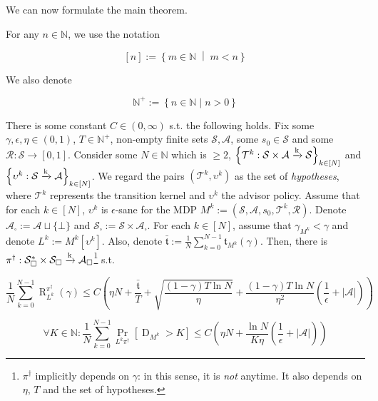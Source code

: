 \documentclass[anon,12pt]{colt2018} %
\newcommand{\AP}[1]{\left(#1\right)}
\newcommand{\AB}[1]{\left[#1\right]}
\newcommand{\AC}[1]{\left\{#1\right\}}
\newcommand{\ACM}[2]{\left\{#1\;\middle\vert\;#2\right\}}
\newcommand{\Pa}[2]{\underset{#1}{\operatorname{Pr}}\AB{#2}}
\newcommand{\Nats}{\mathbb{N}}
\newcommand{\Abs}[1]{\left\vert #1 \right\vert}
\newcommand{\K}{\xrightarrow{\textnormal{k}}}
\newcommand{\A}{\mathcal{A}}
\newcommand{\St}{\mathcal{S}}
\newcommand{\T}{\mathcal{T}}
\newcommand{\R}{\mathcal{R}}
\newcommand{\Rg}{\operatorname{R}}
\newcommand{\MP}[2]{#1#2}
\newcommand{\MA}[2]{#1\AB{#2}}
\newcommand{\Tn}{\mathfrak{t}}
\newcommand{\Ad}{\upsilon}
\newcommand{\ND}{\operatorname{D}}
\begin{document}
We can now formulate the main theorem.

For any $n \in \Nats$, we use the notation 

\[[n]:=\ACM{m\in\Nats}{m < n}\] 

We also denote 

\[\Nats^+:=\AC{n \in \Nats \mid n > 0}\]

\begin{samepage}
\begin{theorem}
\label{thm:regret_bound}

There is some constant $C \in (0,\infty)$ s.t. the following holds. Fix some $\gamma,\epsilon,\eta \in (0,1)$, $T\in\Nats^+$, non-empty finite sets $\St,\A$, some $s_0 \in \St$ and some $\R: \St \rightarrow [0,1]$. Consider some $N \in \Nats$ which is $\geq 2$, $\AC{\T^k: \St \times \A \K \St}_{k\in[N]}$ and $\AC{\Ad^k :\St \K \A}_{k\in[N]}$. We regard the pairs $(\T^k,\Ad^k)$ as the set of \emph{hypotheses}, where $\T^k$ represents the transition kernel and $\Ad^k$ the advisor policy. Assume that for each $k\in[N]$, $\Ad^k$ is $\epsilon$-sane for the MDP $M^k:=\AP{\St,\A,s_0,\T^k,\R}$. Denote $\A_\square:=\A\sqcup\{\bot\}$ and $\St_\square:=\St \times \A_\square$. For each $k \in [N]$, assume that $\gamma_{M^k} < \gamma$ and denote $L^k:=\MA{M^k}{\Ad^k}$. Also, denote $\bar{\Tn}:=\frac{1}{N}\sum_{k=0}^{N-1} \Tn_{M^k}(\gamma)$. Then, there is $\pi^\dagger: \St_\square^* \times \St_\square \K \A_\square$\footnote{$\pi^\dagger$ implicitly depends on $\gamma$: in this sense, it is \emph{not} anytime. It also depends on $\eta$, $T$ and the set of hypotheses.} s.t.

\begin{equation}
\label{eqn:thm__regret_bound__regret}
\frac{1}{N}\sum_{k=0}^{N-1}\Rg_{L^k}^{\pi^\dagger}(\gamma) \leq C\AP{\eta N+\frac{\bar{\Tn}}{T}+\sqrt{\frac{(1-\gamma) T \ln{N}}{\eta}}+\frac{(1-\gamma)T \ln{N}}{\eta^2}\AP{\frac{1}{\epsilon}+\Abs{\A}}}
\end{equation}


\begin{equation}
\label{eqn:thm__regret_bound__delegations}
\forall K \in \Nats: \frac{1}{N}\sum_{k=0}^{N-1}\Pa{\MP{L^k}{\pi^\dagger}}{\ND_{M^k} > K} \leq C\AP{\eta N +\frac{\ln{N}}{K\eta}\AP{\frac{1}{\epsilon}+\Abs{\A}}}
\end{equation}

\end{theorem}
\end{samepage}
\end{document}
